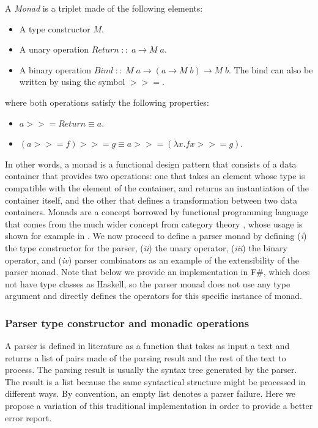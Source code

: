 \begin{definition}
	\label{def:ch_background_monad}
	A \textit{Monad} is a triplet made of the following elements:
	\begin{itemize}[noitemsep]
		\item A type constructor $M$.
		\item A unary operation $Return \; :: \; a \rightarrow M \; a$.
		\item A binary operation $Bind \; :: \; M \; a \rightarrow (a \rightarrow M \; b) \rightarrow M \; b$. The bind can also be written by using the symbol $>>=$.
	\end{itemize}
	where both operations satisfy the following properties:
	\begin{itemize}[noitemsep]
		\item $a >>= Return \equiv a$.
		\item $(a >>= f) >>= g \equiv a >>= (\lambda x.f x >>= g)$.
	\end{itemize}
\end{definition}

In other words, a monad is a functional design pattern that consists of a data container that provides two operations: one that takes an element whose type is compatible with the element of the container, and returns an instantiation of the container itself, and the other that defines a transformation between two data containers. Monads are a concept borrowed by functional programming language that comes from the much wider concept from category theory \cite{asperti1991categories, barr1985toposes, barr1990category, pierce1991basic}, whose usage is shown for example in \cite{moggi1991notions, peyton1993imperative,wadler1990comprehending, wadler1995monads}.
We now proceed to define a parser monad by defining (\textit{i}) the type constructor for the parser, (\textit{ii}) the unary operator, (\textit{iii}) the binary operator, and (\textit{iv}) parser combinators as an example of the extensibility of the parser monad. Note that below we provide an implementation in F\#, which does not have type classes as Haskell, so the parser monad does not use any type argument and directly defines the operators for this specific instance of monad.

\subsubsection{Parser type constructor and monadic operations}

A parser is defined in literature as a function that takes as input a text and returns a list of pairs made of the parsing result and the rest of the text to process. The parsing result is usually the syntax tree generated by the parser. The result is a list because the same syntactical structure might be processed in different ways. By convention, an empty list denotes a parser failure. Here we propose a variation of this traditional implementation in order to provide a better error report.

